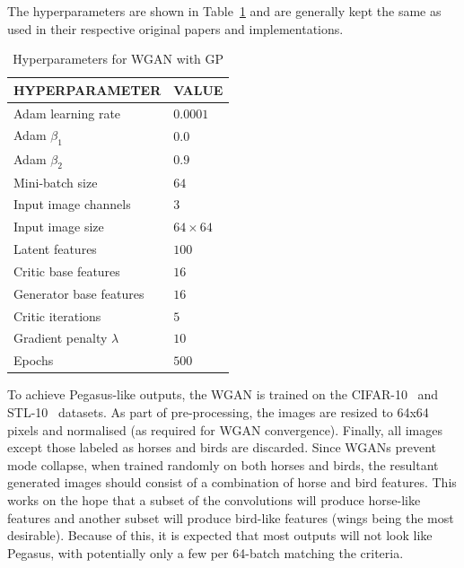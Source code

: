 The hyperparameters are shown in Table~\ref{tab:1} and are generally kept the same as used in their respective original papers and implementations.
\begin{table}[t]
    \centering
    \caption{Hyperparameters for WGAN with GP}
    \label{tab:1}
    \begin{tabular}{l l}
        HYPERPARAMETER               & VALUE \\ [0.5ex]
        \hline
        Adam learning rate           & $0.0001$       \\
        Adam $\beta_1$               & $0.0$          \\
        Adam $\beta_2$               & $0.9$          \\
        Mini-batch size              & $64$           \\
        Input image channels         & $3$            \\
        Input image size             & $64 \times 64$ \\
        Latent features              & $100$          \\
        Critic base features         & $16$           \\
        Generator base features      & $16$           \\
        Critic iterations            & $5$            \\
        Gradient penalty $\lambda{}$ & $10$           \\
        Epochs                       & $500$ \\ [1ex]
    \end{tabular}
\end{table}

To achieve Pegasus-like outputs, the WGAN is trained on the CIFAR-10~\cite{krizhevsky2009cifar10} and STL-10~\cite{coates2011stl10} datasets.
As part of pre-processing, the images are resized to 64x64 pixels and normalised (as required for WGAN convergence).
Finally, all images except those labeled as horses and birds are discarded.
Since WGANs prevent mode collapse, when trained randomly on both horses and birds, the resultant generated images should consist of a combination of horse and bird features.
This works on the hope that a subset of the convolutions will produce horse-like features and another subset will produce bird-like features (wings being the most desirable).
Because of this, it is expected that most outputs will not look like Pegasus, with potentially only a few per 64-batch matching the criteria.
